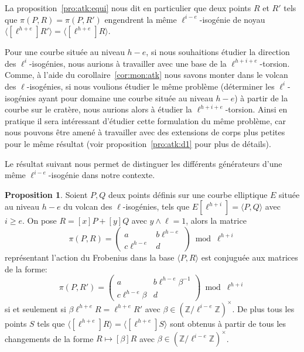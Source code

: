 \documentclass[10pt,a4paper]{book}
\theoremstyle{plain}
\theoremstyle{definition}
\theoremstyle{definition}
\theoremstyle{definition}
\theoremstyle{definition}
\newtheorem{prop}[thm]{Proposition}
\theoremstyle{definition}
\theoremstyle{remark}
\newtheorem{rem}[thm]{Remarque}
\theoremstyle{remark}
\theoremstyle{definition}
\begin{document}
La proposition~\ref{pro:atk:equi} nous dit en particulier que 
deux points $R$ et $R'$ tels que $\pi(P,R)=\pi(P,R')$ engendrent la même 
$\ell^{i-e}$-isogénie de noyau $\langle [\ell^{h+e}]R' \rangle = \langle 
[\ell^{h+e}]R \rangle$.

 


Pour une courbe située au niveau $h-e$, si nous souhaitions étudier 
la direction des $\ell^i$-isogénies, nous aurions à travailler
avec une base de la $\ell^{h+i+e}$-torsion. Comme, à l'aide du 
corollaire~\ref{cor:mon:atk} nous savons monter dans le volcan des 
$\ell$-isogénies, si nous voulions étudier le même 
problème (déterminer les $\ell^{i}$-isogénies ayant pour domaine une courbe 
située au niveau $h-e$) à partir de la courbe sur le cratère, nous aurions alors 
à étudier la $\ell^{h+i+e}$-torsion. Ainsi en pratique il sera intéressant 
d'étudier cette formulation du même problème, car nous pouvons être amené à 
travailler avec des extensions de corps plus petites pour le même résultat 
(voir proposition~\ref{pro:atk:d1} pour plus de détails).


Le résultat suivant nous permet de distinguer les différents générateurs d'une 
même $\ell^{i-e}$-isogénie dans notre contexte.

\begin{prop}
\label{pro:cla:fro:mat}
Soient $P,Q$ deux points définis sur une courbe elliptique $E$ située au niveau
$h-e$ du volcan des $\ell$-isogénies, tels que 
$E[\ell^{h+i}]=\langle P,Q \rangle$ avec $i \geqslant e$. On pose $R=[x]P+[y]Q$ avec $y\wedge 
\ell=1$, alors la matrice 
\[
\pi(P,R)=\left ( \begin{matrix}a & b\ell^{h-e} \\ c\ell^{h-e} & d
\end{matrix}\right ) \bmod \ell^{h+i}
\] représentant l'action du Frobenius dans la base $\langle P,R \rangle$ est
conjuguée aux matrices de la forme:
\[
\pi(P,R')=\left ( \begin{matrix}a & b\ell^{h-e}\beta^{-1} \\ c\ell^{h-e}\beta & d
\end{matrix}\right ) \bmod \ell^{h+i}
\]
si et seulement si $\beta \ell^{h+e}R= \ell^{h+e}R'$ avec $\beta \in \left( \mathbb{Z}/\ell^{i-e} \mathbb{Z} 
\right)^{\times}$. De plus tous les points $S$ tels que $\langle [\ell^{h+e}]R \rangle = \langle [\ell^{h+e}]S \rangle$ sont obtenus à partir de tous les changements de la forme 
$R \mapsto [\beta]R$ avec $\beta \in \left( \mathbb{Z}/\ell^{i-e}\mathbb{Z} 
\right)^{\times}$.
\end{prop}
\end{document}
